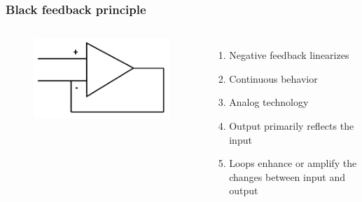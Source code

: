 \documentclass{beamer}
\begin{document}

\begin{frame}
\frametitle{Black feedback principle}
\vspace{-2ex}
\begin{columns}[c]

\begin{figure}
\includegraphics[width=1\linewidth]{negative}
\end{figure}
\vspace{-4ex}
\begin{enumerate}
\item Negative feedback linearizes
\item Continuous behavior
\item Analog technology
\item Output primarily reflects the input
\item Loops enhance or amplify the changes between input and output
\end{enumerate}


\end{columns}
\end{frame}
\end{document}
